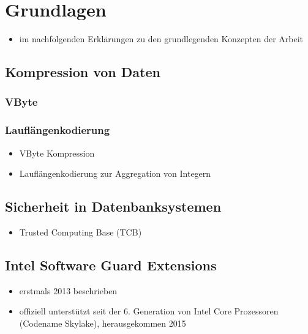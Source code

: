 
\chapter{Grundlagen}
\begin{itemize}
	\item im nachfolgenden Erklärungen zu den grundlegenden Konzepten der Arbeit
\end{itemize}
\section{Kompression von Daten}
\subsection{VByte}
\subsection{Lauflängenkodierung}
\begin{itemize}
	\item VByte Kompression
	\item Lauflängenkodierung zur Aggregation von Integern
\end{itemize}
\section{Sicherheit in Datenbanksystemen}
\begin{itemize}
	\item Trusted Computing Base (TCB)
\end{itemize}
\section{Intel Software Guard Extensions}
\begin{itemize}
	\item erstmals 2013 beschrieben
	\item offiziell unterstützt seit der 6. Generation von Intel Core Prozessoren (Codename Skylake), herausgekommen 2015
\end{itemize}
